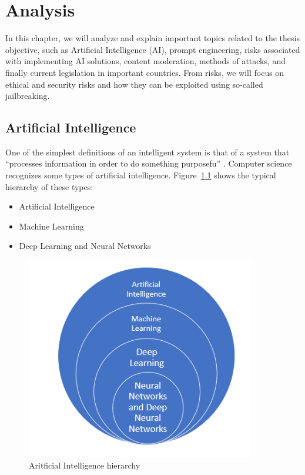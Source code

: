 \chapter{Analysis}

In this chapter, we will analyze and explain important topics related to the thesis objective, such as Artificial Intelligence (AI), prompt engineering, risks associated with implementing AI solutions, content moderation, methods of attacks, and finally current legislation in important countries. From risks, we will focus on ethical and security risks and how they can be exploited using so-called jailbreaking.

\section{Artificial Intelligence}
One of the simplest definitions of an intelligent system is that of a system that ``processes information in order to do something purposefu'' \cite{Dignum_2019}. Computer science recognizes some types of artificial intelligence. Figure~\ref{fig:AI-ML-DL-NN} shows the typical hierarchy of these types:

\begin{itemize}
    \item Artificial Intelligence
    \item Machine Learning
    \item Deep Learning and Neural Networks
\end{itemize}

\begin{figure}[htpb]
\begin{centering}
\includegraphics[width=10cm]{./assets/images/final deep learning.png}
\par\end{centering}
\caption{Aritficial Intelligence hierarchy \cite{ai_hierarchy_pic}
\label{fig:AI-ML-DL-NN}}
\end{figure}

